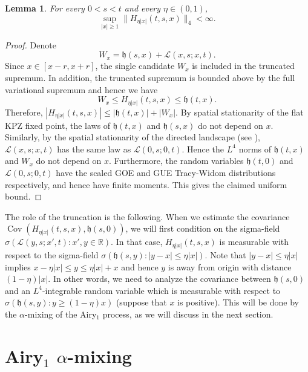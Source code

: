 \documentclass[12pt, reqno]{amsart}
\numberwithin{equation}{section}
\newtheorem{lemma}[theorem]{Lemma}
\theoremstyle{definition}
\newcommand{\R}{\mathbb{R}}
\newcommand{\h}{\mathfrak{h}}
\newcommand{\Cov}{\operatorname{Cov}}
\newcommand{\Lcal}{\mathcal{L}}
\begin{document}
\begin{lemma}\label{L:truncated-moments}
  For every $0<s<t$ and every $\eta\in(0,1)$,
  \begin{equation}
    \sup_{|x|\ge1}
    \|H_{\eta |x|}(t,s,x)\|_4 <\infty.
    \label{E:truncated-moments}
  \end{equation}
\end{lemma}

\begin{proof}
  Denote
  \[
    W_x=\h(s,x)+\Lcal(x,s;x,t).
  \]
  Since $x\in[x-r,x+r]$, the single candidate $W_x$ is included in the
  truncated supremum.  In addition, the truncated supremum is bounded above by
  the full variational supremum and hence we have
  \[
    W_x\le H_{\eta|x|}(t,s,x)\le \h(t,x).
  \]
  Therefore, $|H_{\eta|x|}(t,s,x)|\le |\h(t,x)|+|W_x|$.  By spatial
  stationarity of the flat KPZ fixed point, the laws of $\h(t,x)$ and $\h(s,x)$
  do not depend on $x$.  Similarly, by the spatial stationarity of the directed
  landscape (see \cite[Lemma 10.2 (2)]{dauvergne.ortmann.ea:22:directed}),
  $\Lcal(x,s;x,t)$ has the same law as $\Lcal(0,s;0,t)$.   Hence the $L^4$
  norms of $\h(t,x)$ and $W_x$ do not depend on $x$. Furthermore, the random
  variables $\h(t,0)$ and $\Lcal(0,s;0,t)$ have the scaled GOE and GUE
  Tracy-Widom distributions respectively, and hence have finite moments. This
  gives the claimed uniform bound.
\end{proof}

The role of the truncation is the following. When we estimate the covariance $
\Cov(H_{\eta|x|}(t,s,x), \h(s,0))$, we will first condition on the sigma-field
$\sigma(\Lcal(y,s;x',t):x',y\in\R)$. In that case, $H_{\eta|x|}(t,s,x)$ is
measurable with respect to the sigma-field $\sigma(\h(s,y): |y-x|\leq \eta|x|)$.
Note that $|y-x|\leq \eta|x|$ implies $x-\eta|x|\leq y\leq \eta|x|+x$ and hence
$y$ is away from origin with distance $(1-\eta)|x|$. In other words, we need to
analyze the covariance between $\h(s,0)$ and an $L^4$-integrable random variable
which is measurable with respect to $\sigma(\h(s,y): y\geq (1-\eta)x)$ (suppose
that $x$ is positive). This will be done by the $\alpha$-mixing of the Airy$_1$
process, as we will discuss in the next section. 

\section{\texorpdfstring{Airy$_1$ $\alpha$-mixing}{Airy1 alpha-mixing}}\label{S:airy1-mixing}
\end{document}
